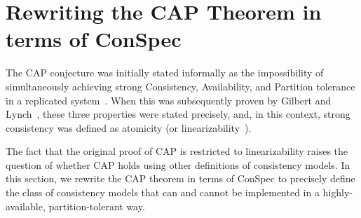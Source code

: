 \documentclass[journal, compsoc]{IEEEtran}
\begin{document}
	
	\section{Rewriting the CAP Theorem in terms of ConSpec}\label{sec:cap}
	The CAP conjecture was initially stated informally as the impossibility of simultaneously achieving strong Consistency, Availability, and Partition tolerance in a replicated system~\cite{brew:cap}. When this was subsequently proven by Gilbert and Lynch~\cite{Gilbert:2002:BCF:564585.564601}, these three properties were stated precisely, and, in this context, strong consistency was defined as atomicity (or linearizability~\cite{Herlihy:1990:LCC:78969.78972}).
	
	The fact that the original proof of CAP is restricted to linearizability raises the question of whether CAP holds using other definitions of
	consistency models.
	In this section, we rewrite the CAP theorem in terms of ConSpec to precisely define the class of consistency models that can and cannot be implemented in a highly-available, partition-tolerant way.
	
\end{document}
